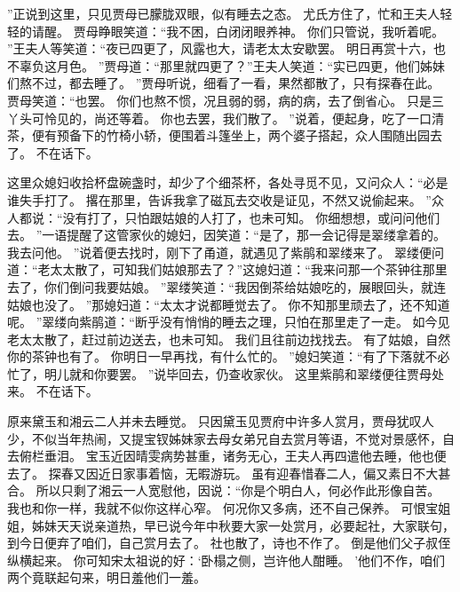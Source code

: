 ”正说到这里，只见贾母已朦胧双眼，似有睡去之态。
尤氏方住了，忙和王夫人轻轻的请醒。
贾母睁眼笑道：“我不困，白闭闭眼养神。
你们只管说，我听着呢。
”王夫人等笑道：“夜已四更了，风露也大，请老太太安歇罢。
明日再赏十六，也不辜负这月色。
”贾母道：“那里就四更了？”王夫人笑道：“实已四更，他们姊妹们熬不过，都去睡了。
”贾母听说，细看了一看，果然都散了，只有探春在此。
贾母笑道：“也罢。
你们也熬不惯，况且弱的弱，病的病，去了倒省心。
只是三丫头可怜见的，尚还等着。
你也去罢，我们散了。
”说着，便起身，吃了一口清茶，便有预备下的竹椅小轿，便围着斗篷坐上，两个婆子搭起，众人围随出园去了。
不在话下。
\par
这里众媳妇收拾杯盘碗盏时，却少了个细茶杯，各处寻觅不见，又问众人：“必是谁失手打了。
撂在那里，告诉我拿了磁瓦去交收是证见，不然又说偷起来。
”众人都说：“没有打了，只怕跟姑娘的人打了，也未可知。
你细想想，或问问他们去。
”一语提醒了这管家伙的媳妇，因笑道：“是了，那一会记得是翠缕拿着的。
我去问他。
”说着便去找时，刚下了甬道，就遇见了紫鹃和翠缕来了。
翠缕便问道：“老太太散了，可知我们姑娘那去了？”这媳妇道：“我来问那一个茶钟往那里去了，你们倒问我要姑娘。
”翠缕笑道：“我因倒茶给姑娘吃的，展眼回头，就连姑娘也没了。
”那媳妇道：“太太才说都睡觉去了。
你不知那里顽去了，还不知道呢。
”翠缕向紫鹃道：“断乎没有悄悄的睡去之理，只怕在那里走了一走。
如今见老太太散了，赶过前边送去，也未可知。
我们且往前边找找去。
有了姑娘，自然你的茶钟也有了。
你明日一早再找，有什么忙的。
”媳妇笑道：“有了下落就不必忙了，明儿就和你要罢。
”说毕回去，仍查收家伙。
这里紫鹃和翠缕便往贾母处来。
不在话下。
\par
原来黛玉和湘云二人并未去睡觉。
只因黛玉见贾府中许多人赏月，贾母犹叹人少，不似当年热闹，又提宝钗姊妹家去母女弟兄自去赏月等语，不觉对景感怀，自去俯栏垂泪。
宝玉近因晴雯病势甚重，诸务无心，王夫人再四遣他去睡，他也便去了。
探春又因近日家事着恼，无暇游玩。
虽有迎春惜春二人，偏又素日不大甚合。
所以只剩了湘云一人宽慰他，因说：“你是个明白人，何必作此形像自苦。
我也和你一样，我就不似你这样心窄。
何况你又多病，还不自己保养。
可恨宝姐姐，姊妹天天说亲道热，早已说今年中秋要大家一处赏月，必要起社，大家联句，到今日便弃了咱们，自己赏月去了。
社也散了，诗也不作了。
倒是他们父子叔侄纵横起来。
你可知宋太祖说的好：‘卧榻之侧，岂许他人酣睡。
’他们不作，咱们两个竟联起句来，明日羞他们一羞。
